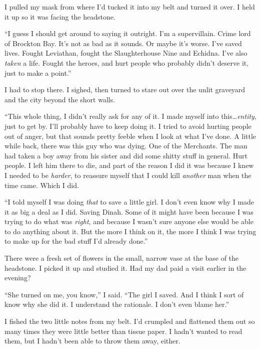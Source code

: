 I pulled my mask from where I'd tucked it into my belt and turned it over.  I held it up so it was facing the headstone.



``I guess I should get around to saying it outright.  I'm a supervillain.  Crime lord of Brockton Bay.  It's not as bad as it sounds.  Or maybe it's worse.  I've saved lives.  Fought Leviathan, fought the Slaughterhouse Nine and Echidna.  I've also \emph{taken} a life.  Fought the heroes, and hurt people who probably didn't deserve it, just to make a point.''



I had to stop there.  I sighed, then turned to stare out over the unlit graveyard and the city beyond the short walls.



``This whole thing, I didn't really ask for any of it.  I made myself into this\ldots \emph{entity}, just to get by.  I'll probably have to keep doing it.  I tried to avoid hurting people out of anger, but that sounds pretty feeble when I look at what I've done.  A little while back, there was this guy who was dying.  One of the Merchants.  The man had taken a boy away from his sister and did some shitty stuff in general.  Hurt people.  I left him there to die, and part of the reason I did it was because I knew I needed to be \emph{harder}, to reassure myself that I could kill \emph{another} man when the time came.  Which I did.



``I told myself I was doing \emph{that} to save a little girl.  I don't even know why I made it as big a deal as I did.  Saving Dinah.  Some of it might have been because I was trying to do what was \emph{right}, and because I wasn't sure anyone else would be able to do anything about it.  But the more I think on it, the more I think I was trying to make up for the bad stuff I'd already done.''



There were a fresh set of flowers in the small, narrow vase at the base of the headstone.  I picked it up and studied it.  Had my dad paid a visit earlier in the evening?



``She turned on me, you know,'' I said.  ``The girl I saved.  And I think I sort of know why she did it.  I understand the rationale.  I don't even blame her.''



I fished the two little notes from my belt.  I'd crumpled and flattened them out so many times they were little better than tissue paper.  I hadn't wanted to read them, but I hadn't been able to throw them away, either.



